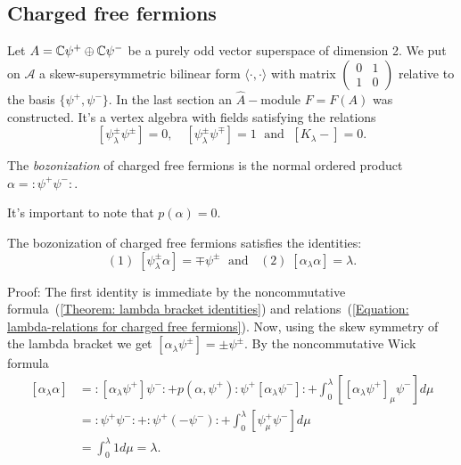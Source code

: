 \subsection{Charged free fermions}
Let $A=\mathbb{C}\psi^+\oplus\mathbb{C}\psi^-$ be a purely odd vector superspace of dimension 2. We put on $\mathcal{A}$ a skew-supersymmetric bilinear form $\langle\cdot,\cdot\rangle$ with matrix $\left(\begin{smallmatrix} 0&1\\1&0\end{smallmatrix}\right)$ relative to the basis $\{\psi^+,\psi^-\}$. In the last section an $\hat{A}-$module $F=F(A)$ was constructed. It's a vertex algebra with fields satisfying the relations
\begin{equation}\label{Equation: lambda-relations for charged free fermions}
     [\psi^{\pm}_\lambda\psi^\pm]=0, \quad [\psi^{\pm}_\lambda\psi^\mp]=1\;\text{ and }\; [K_\lambda -]=0.
\end{equation}
\begin{dang}
    \begin{definition}\cite{kac2013bombay}
        The \textit{bozonization} of charged free fermions is the normal ordered product $\alpha =:\psi^+\psi^-:$. 
    \end{definition}
\end{dang}
It's important to note that $p(\alpha)=0$.
\begin{dang}
    \begin{lemma}
    The bozonization of charged free fermions satisfies the identities:
    \begin{equation}
        (1)\;[\psi^\pm_\lambda\alpha]=\mp\psi^\pm\;\text{ and }\;\;(2)\;[\alpha_\lambda \alpha]=\lambda.
    \end{equation}
\end{lemma}
\end{dang}
Proof: The first identity is immediate by the noncommutative formula~(\ref{Theorem: lambda bracket identities}) and relations~(\ref{Equation: lambda-relations for charged free fermions}). Now, using the skew symmetry of the lambda bracket we get $[\alpha_\lambda\psi^\pm]=\pm\psi^\pm$. By the noncommutative Wick formula
\begin{equation}
    \begin{split}
        [\alpha_\lambda\alpha]&= :[\alpha_\lambda\psi^+]\psi^-:+p(\alpha,\psi^+):\psi^+[\alpha_\lambda\psi^-]:+\int_0^\lambda[[\alpha_\lambda\psi^+]_\mu\psi^-]d\mu\\
        &=:\psi^+\psi^-:+:\psi^+(-\psi^-):+\int_0^\lambda[\psi^+_\mu\psi^-]d\mu\\
        &=\int_0^\lambda 1d\mu= \lambda.
    \end{split}
\end{equation}
